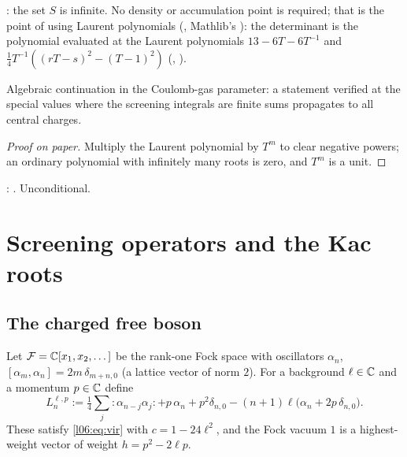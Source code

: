 \begin{dictionary}
: the set $S$ is infinite. No density or accumulation point is required; that is the
point of using Laurent polynomials (, Mathlib's ): the
determinant is the polynomial  evaluated at the Laurent polynomials
$13-6T-6T^{-1}$ and $\frac14T^{-1}((rT-s)^2-(T-1)^2)$ (, ).
\end{dictionary}

\begin{physics}
Algebraic continuation in the Coulomb-gas parameter: a statement verified at the special values where the
screening integrals are finite sums propagates to all central charges.
\end{physics}

\begin{proof}[Proof on paper]
Multiply the Laurent polynomial by $T^m$ to clear negative powers; an ordinary polynomial with infinitely
many roots is zero, and $T^m$ is a unit.
\end{proof}

\begin{status}
\allowbreak{}\allowbreak{}\allowbreak{}: \lean{[propext, Classical.}\allowbreak{}\allowbreak\lean{sound]}. Unconditional.
\end{status}

\section{Screening operators and the Kac roots}\label{l06:sec:screening}

\subsection{The charged free boson}

\begin{definition}\label{l06:def:chargedfock}
Let $\mathcal F = {\mathbb{C}}[x_1,x_2,\dots]$ be the rank-one Fock space with oscillators $\alpha_n$,
$[\alpha_m,\alpha_n] = 2m\,\delta_{m+n,0}$ (a lattice vector of norm $2$). For a background $\ell\in{\mathbb{C}}$ and a
momentum $p\in{\mathbb{C}}$ define
\begin{equation*}
 L^{\ell,p}_n := \tfrac14\sum_j{:}\alpha_{n-j}\alpha_j{:}+p\,\alpha_n+p^2\delta_{n,0}
 -(n+1)\ell\bigl(\alpha_n+2p\,\delta_{n,0}\bigr).
\end{equation*}
These satisfy \eqref{l06:eq:vir} with $c = 1-24\ell^2$, and the Fock vacuum $1$ is a highest-weight vector
of weight $h = p^2-2\ell p$.
\end{definition}

